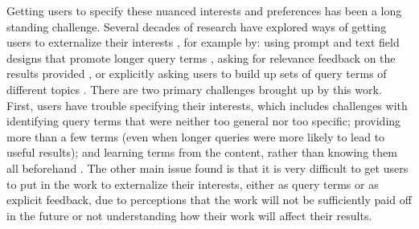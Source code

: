 Getting users to specify these nuanced interests and preferences has been a long standing challenge. Several decades of research have explored ways of getting users to externalize their interests \cite{jansen2000real,belkin2001rutgers}, for example by: using prompt and text field designs that promote longer query terms \cite{franzen2000verbosity,belkin2003query}, asking for relevance feedback on the results provided \cite{salton1990improving,rui1998relevance,peltonen2017negative}, or explicitly asking users to build up sets of query terms of different topics \cite{hearst1996visualizing,hoeber2006comparative}. There are two primary challenges brought up by this work. First, users have trouble specifying their interests, which includes challenges with identifying query terms that were neither too general nor too specific; providing more than a few terms (even when longer queries were more likely to lead to useful results); and learning terms from the content, rather than knowing them all beforehand  \cite{belkin2003query,salton1990improving}. The other main issue found is that it is very difficult to get users to put in the work to externalize their interests, either as query terms or as explicit feedback, due to perceptions that the work will not be sufficiently paid off in the future or not understanding how their work will affect their results. 

